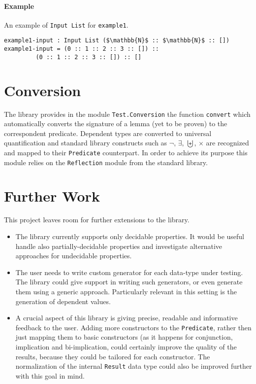 \documentclass[10pt,a4paper]{article}
\begin{document}
\paragraph{Example} An example of \texttt{Input List} for \texttt{example1}.
\begin{lstlisting}
example1-input : Input List ($\mathbb{N}$ :: $\mathbb{N}$ :: [])
example1-input = (0 :: 1 :: 2 :: 3 :: []) :: 
		 (0 :: 1 :: 2 :: 3 :: []) :: []
\end{lstlisting}

\section{Conversion}
The library provides in the module \texttt{Test.Conversion} the function \texttt{convert} which automatically converts the signature of a lemma (yet to be proven) to the correspondent predicate. Dependent types are converted to universal quantification and standard library constructs such as $\neg$, $\exists$, $\biguplus$, $\times$ are recognized and mapped to their \texttt{Predicate} counterpart.
In order to achieve its purpose this module relies on the \texttt{Reflection} module from the standard library.

\section{Further Work}
This project leaves room for further extensions to the library.
\begin{itemize}
	\item The library currently supports only decidable properties. It would be useful handle also partially-decidable properties and investigate alternative approaches for undecidable properties.
	\item The user needs to write custom generator for each data-type under testing. The library could give support in writing such generators, or even generate them using a generic approach. Particularly relevant in this setting is the generation of dependent values.
	\item A crucial aspect of this library is giving precise, readable and informative feedback to the user. Adding more constructors to the \texttt{Predicate}, rather then just mapping them to basic constructors (as it happens for conjunction, implication and bi-implication, could certainly improve the quality of the results, because they could be tailored for each constructor. The normalization of the internal \texttt{Result} data type could also be improved further with this goal in mind.
\end{itemize}
\end{document}
